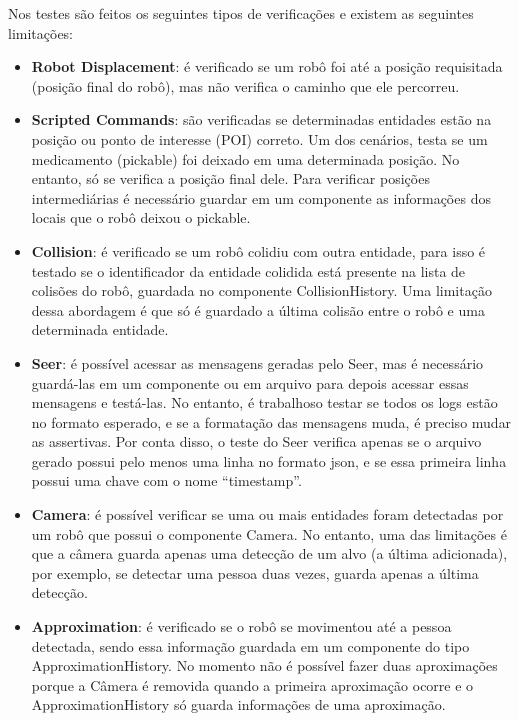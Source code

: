 Nos testes são feitos os seguintes tipos de verificações e existem as seguintes limitações:
\begin{itemize}
    \item \textbf{Robot Displacement}: é verificado se um robô foi até a posição requisitada (posição final do robô), mas não verifica o caminho que ele percorreu.

    \item \textbf{Scripted Commands}: são verificadas se determinadas entidades estão na posição ou ponto de interesse (POI) correto. Um dos cenários, testa se um medicamento (pickable) foi deixado em uma determinada posição. No entanto, só se verifica a posição final dele. Para verificar posições intermediárias é necessário guardar em um componente as informações dos locais que o robô deixou o pickable.

    \item \textbf{Collision}: é verificado se um robô colidiu com outra entidade, para isso é testado se o identificador da entidade colidida está presente na lista de colisões do robô, guardada no componente CollisionHistory. Uma limitação dessa abordagem é que só é guardado a última colisão entre o robô e uma determinada entidade.

    \item \textbf{Seer}: é possível acessar as mensagens geradas pelo Seer, mas é necessário guardá-las em um componente ou em arquivo para depois acessar essas mensagens e testá-las. No entanto, é trabalhoso testar se todos os logs estão no formato esperado, e se a formatação das mensagens muda, é preciso mudar as assertivas. Por conta disso, o teste do Seer verifica apenas se o arquivo gerado possui pelo menos uma linha no formato json, e se essa primeira linha possui uma chave com o nome “timestamp”.
    
    \item \textbf{Camera}: é possível verificar se uma ou mais entidades foram detectadas por um robô que possui o componente Camera. No entanto, uma das limitações é que a câmera guarda apenas uma detecção de um alvo (a última adicionada), por exemplo, se detectar uma pessoa duas vezes, guarda apenas a última detecção.

    \item \textbf{Approximation}: é verificado se o robô se movimentou até a pessoa detectada, sendo essa informação guardada em um componente do tipo ApproximationHistory. No momento não é possível fazer duas aproximações porque a Câmera é removida quando a primeira aproximação ocorre e o ApproximationHistory só guarda informações de uma aproximação.
\end{itemize}

